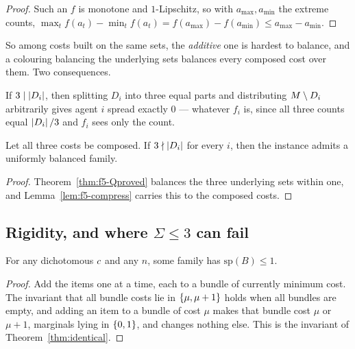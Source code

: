 \begin{proof}
Such an $f$ is monotone and $1$-Lipschitz, so with $a_{\max}, a_{\min}$ the
extreme counts, $\max_t f(a_t) - \min_t f(a_t) = f(a_{\max}) - f(a_{\min}) \le
a_{\max} - a_{\min}$.
\end{proof}

So among costs built on the same sets, the \emph{additive} one is hardest to
balance, and a colouring balancing the underlying sets balances every composed
cost over them. Two consequences.

\begin{corollary}
\label{cor:f5-freezero}
If $3 \mid \left\lvert D_i\right\rvert$, then splitting $D_i$ into three equal parts and
distributing $M \setminus D_i$ arbitrarily gives agent $i$ spread exactly
$0$ --- whatever $f_i$ is, since all three counts equal $\left\lvert D_i\right\rvert/3$ and $f_i$
sees only the count.
\end{corollary}

\begin{corollary}
\label{cor:f5-residual-shape}
Let all three costs be composed. If $3 \nmid \left\lvert D_i\right\rvert$ for every $i$, then the
instance admits a uniformly balanced family.
\end{corollary}

\begin{proof}
Theorem~\ref{thm:f5-Qproved} balances the three underlying sets within one, and
Lemma~\ref{lem:f5-compress} carries this to the composed costs.
\end{proof}

\subsection{Rigidity, and where $\Sigma \le 3$ can fail}
\label{sec:f5-rigid}

\begin{lemma}
\label{lem:f5-indiv}
For any dichotomous $c$ and any $n$, some family has $\mathrm{sp}(B) \le 1$.
\end{lemma}

\begin{proof}
Add the items one at a time, each to a bundle of currently minimum cost. The
invariant that all bundle costs lie in $\left\{\mu,\mu+1\right\}$ holds when all bundles
are empty, and adding an item to a bundle of cost $\mu$ makes that bundle cost
$\mu$ or $\mu+1$, marginals lying in $\left\{0,1\right\}$, and changes nothing else. This
is the invariant of Theorem~\ref{thm:identical}.
\end{proof}

